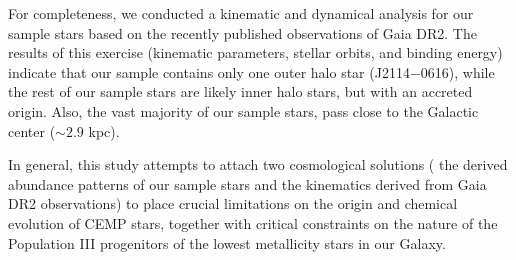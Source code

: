 For completeness, we conducted a kinematic and dynamical analysis for our sample stars based on the recently published observations of Gaia DR2. The results of this exercise (kinematic parameters, stellar orbits, and binding energy) indicate that our sample contains only one outer halo star (J2114$-$0616), while the rest of our sample stars are likely inner halo stars, but with an accreted origin. Also, the vast majority of our sample stars, pass close to the Galactic center ($\sim 2.9$ kpc). 


In general, this study attempts to attach two cosmological solutions ( the derived abundance patterns of our sample stars and the kinematics derived from Gaia DR2 observations) to place crucial limitations on the origin and
chemical evolution of CEMP stars, together with critical constraints on the nature of the Population III progenitors of the lowest metallicity stars in our Galaxy.










